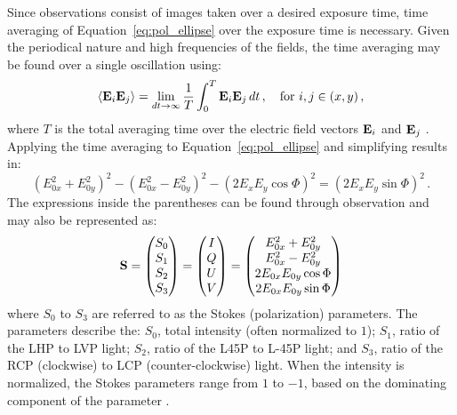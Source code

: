 Since observations consist of images taken over a desired exposure time, time averaging of Equation~\ref{eq:pol_ellipse} over the exposure time is necessary. Given the periodical nature and high frequencies of the fields, the time averaging may be found over a single oscillation using:
\begin{equation}
    \left< \mathbf{E}_{i} \mathbf{E}_{j} \right> = \lim_{dt \rightarrow \infty} \frac{1}{T} \int_{0}^{T} \mathbf{E}_{i} \mathbf{E}_{j}\,dt\,,\quad \text{for } i, j \in (x, y)\,,\label{eq:pol_t_avg}
\end{equation}
where $T$ is the total averaging time over the electric field vectors $\mathbf{E}_{i}$ and $\mathbf{E}_{j}$ \citep{field_guide}. Applying the time averaging to Equation~\ref{eq:pol_ellipse} and simplifying results in:
\begin{equation}
    (E_{0x}^{2} + E_{0y}^{2})^{2} - (E_{0x}^{2} - E_{0y}^{2})^{2} - (2 E_{x} E_{y} \cos \Phi)^{2} = (2 E_{x} E_{y} \sin \Phi)^{2}\,.\label{eq:pol_ellipse_alt}
\end{equation}
The expressions inside the parentheses can be found through observation and may also be represented as:
\begin{equation}
    \mathbf{S} =
    \begin{pmatrix}
        S_{0} \\
        S_{1} \\
        S_{2} \\
        S_{3}
    \end{pmatrix}
    =
    \begin{pmatrix}
        I \\
        Q \\
        U \\
        V
    \end{pmatrix}
    =
    \begin{pmatrix}
        E_{0x}^{2} + E_{0y}^{2}   \\
        E_{0x}^{2} - E_{0y}^{2}   \\
        2 E_{0x} E_{0y} \cos \Phi \\
        2 E_{0x} E_{0y} \sin \Phi
    \end{pmatrix}
    \label{eq:Stokes_params}
\end{equation}
where $S_{0}$ to $ S_{3}$ are referred to as the Stokes (polarization) parameters. The parameters describe the: $S_{0}$, total intensity (often normalized to $1$); $S_{1}$, ratio of the \gls{LHP} to \gls{LVP} light; $S_{2}$, ratio of the \gls{L45P} to \gls{L-45P} light; and $S_{3}$, ratio of the \gls{RCP} (clockwise) to \gls{LCP} (counter-clockwise) light. When the intensity is normalized, the Stokes parameters range from $1$ to $-1$, based on the dominating component of the parameter \citep{Stokes, chandrasekhar}.


